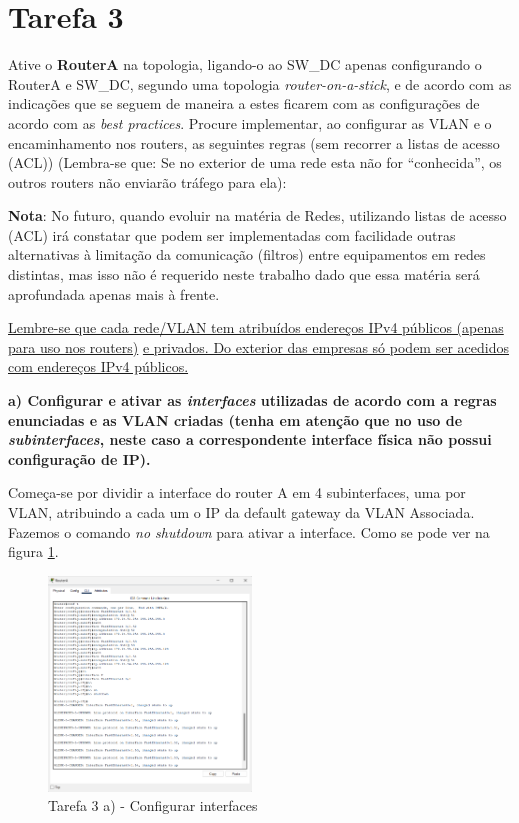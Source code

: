 \documentclass[11pt,english, openright, oneside]{book}
\begin{document}
\section{Tarefa 3}
\vspace{0.2cm}

Ative o \textbf{RouterA} na topologia, ligando-o ao SW\_DC apenas configurando o
RouterA e SW\_DC, segundo uma topologia \textit{router-on-a-stick}, e de acordo
com as indicações que se seguem de maneira a estes ficarem com as configurações
de acordo com as \textit{best practices}. Procure implementar, ao configurar as
VLAN e o encaminhamento nos routers, as seguintes regras (sem recorrer a listas
de acesso (ACL)) (Lembra-se que: Se no exterior de uma rede esta não for
“conhecida”, os outros routers não enviarão tráfego para ela):

\textbf{Nota}: No futuro, quando evoluir na matéria de Redes, utilizando listas
de acesso (ACL) irá constatar que podem ser implementadas com facilidade outras
alternativas à limitação da comunicação (filtros) entre equipamentos em redes
distintas, mas isso não é requerido neste trabalho dado que essa matéria será
aprofundada apenas mais à frente.

\underline{Lembre-se que cada rede/VLAN tem atribuídos endereços IPv4 públicos (apenas para uso nos routers)}
\underline{e privados. Do exterior das empresas só podem ser acedidos com endereços IPv4 públicos.}

\vspace{0.8cm}

\textbf{a) Configurar e ativar as \textit{interfaces} utilizadas de acordo com a
regras enunciadas e as VLAN criadas (tenha em atenção que no uso de
\textit{subinterfaces}, neste caso a correspondente interface física não possui
configuração de IP).}
\vspace{0.2cm}

Começa-se por dividir a interface do router A em 4 subinterfaces, uma por VLAN,
atribuindo a cada um o IP da default gateway da VLAN Associada. Fazemos o
comando \textit{no shutdown} para ativar a interface. Como se pode ver na figura
\ref{fig:3a}.

\begin{figure}[H]
    \centering
    \includegraphics[width=0.48\textwidth]{imagens/Tarefa3/3.a.png}
    \caption{Tarefa 3 a) - Configurar interfaces}
    \label{fig:3a}
\end{figure}
\end{document}
